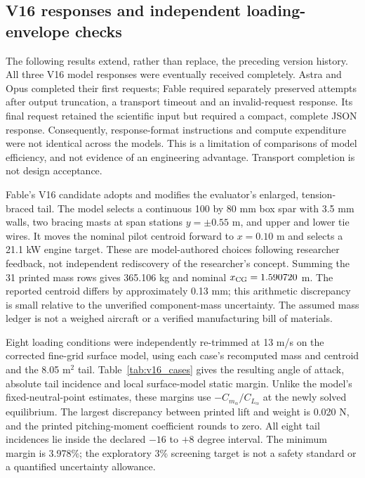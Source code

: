 \documentclass[11pt,a4paper]{article}
\begin{document}
\subsection{V16 responses and independent loading-envelope checks}
\label{sec:v16_update}
The following results extend, rather than replace, the preceding version history.
All three V16 model responses were eventually received completely. Astra and Opus
completed their first requests; Fable required separately preserved attempts after
output truncation, a transport timeout and an invalid-request response. Its final
request retained the scientific input but required a compact, complete JSON response.
Consequently, response-format instructions and compute expenditure were not identical
across the models. This is a limitation of comparisons of model efficiency, and not
evidence of an engineering advantage. Transport completion is not design acceptance.

Fable's V16 candidate adopts and modifies the evaluator's enlarged, tension-braced
tail. The model selects a continuous 100 by 80 mm box spar with 3.5 mm walls, two
bracing masts at span stations $y=\pm0.55$ m, and upper and lower tie wires. It moves
the nominal pilot centroid forward to $x=0.10$ m and selects a 21.1 kW engine target.
These are model-authored choices following researcher feedback, not independent
rediscovery of the researcher's concept. Summing the 31 printed mass rows gives
365.106 kg and nominal $x_{\rm CG}=1.590720$ m. The reported centroid differs by
approximately 0.13 mm; this arithmetic discrepancy is small relative to the
unverified component-mass uncertainty. The assumed mass ledger is not a weighed
aircraft or a verified manufacturing bill of materials.

Eight loading conditions were independently re-trimmed at 13 m/s on the corrected
fine-grid surface model, using each case's recomputed mass and centroid and the
8.05 m$^2$ tail. Table~\ref{tab:v16_cases} gives the resulting angle of attack,
absolute tail incidence and local surface-model static margin. Unlike the model's
fixed-neutral-point estimates, these margins use $-C_{m_\alpha}/C_{L_\alpha}$ at
the newly solved equilibrium. The largest discrepancy between printed lift and
weight is 0.020 N, and the printed pitching-moment coefficient rounds to zero.
All eight tail incidences lie inside the declared $-16$ to $+8$ degree interval.
The minimum margin is 3.978\%; the exploratory 3\% screening target is not a safety
standard or a quantified uncertainty allowance.
\end{document}
